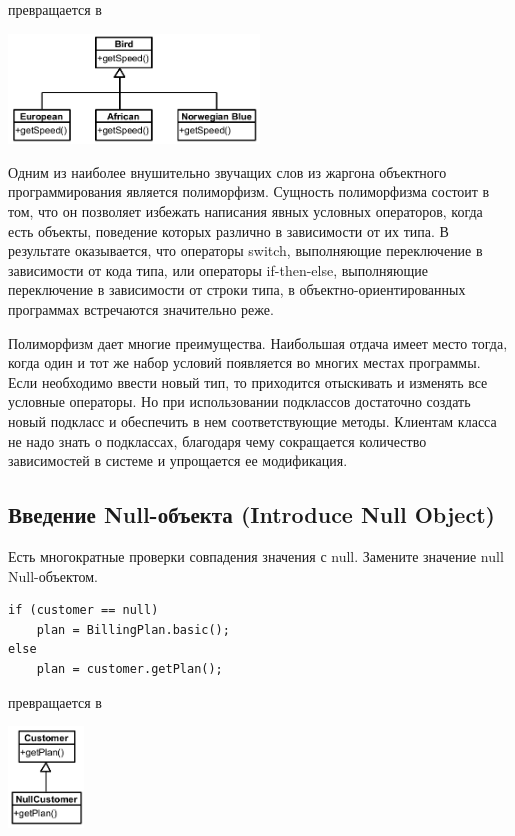 \documentclass{../../text-style}
\begin{document}
превращается в

\begin{center}
    \includegraphics[width=0.5\textwidth]{replaceConditionalWithPolymorphism.png}
\end{center}

Одним из наиболее внушительно звучащих слов из жаргона объектного программирования является полиморфизм. Сущность полиморфизма состоит в том, что он позволяет избежать написания явных условных операторов, когда есть объекты, поведение которых различно в зависимости от их типа. В результате оказывается, что операторы switch, выполняющие переключение в зависимости от кода типа, или операторы if-then-else, выполняющие переключение в зависимости от строки типа, в объектно-ориентированных программах встречаются значительно реже.

Полиморфизм дает многие преимущества. Наибольшая отдача имеет место тогда, когда один и тот же набор условий появляется во многих местах программы. Если необходимо ввести новый тип, то приходится отыскивать и изменять все условные операторы. Но при использовании подклассов достаточно создать новый подкласс и обеспечить в нем соответствующие методы. Клиентам класса не надо знать о подклассах, благодаря чему сокращается количество зависимостей в системе и упрощается ее модификация.

\subsection{Введение Null-объекта (Introduce Null Object)}

Есть многократные проверки совпадения значения с null. Замените значение null Null-объектом.

\begin{verbatim}
if (customer == null)
    plan = BillingPlan.basic();
else
    plan = customer.getPlan();
\end{verbatim}

превращается в

\begin{center}
    \includegraphics[width=0.15\textwidth]{nullObject.png}
\end{center}
\end{document}
